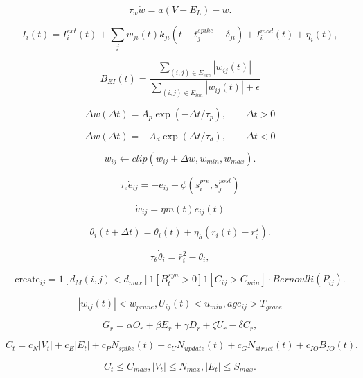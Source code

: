 \[
\tau_{w}\dot{w} = a\left( V - E_{L} \right) - w.
\]

\[
I_{i}(t) = I_{i}^{ext}(t) + \sum_jw_{ji}(t)k_{ji}\left( t - t_{j}^{spike} - \delta_{ji} \right) + I_{i}^{mod}(t) + \eta_{i}(t),
\]

\[
B_{EI}(t) = \frac{\sum_{(i,j)\in E_{exc}}\left| w_{ij}(t) \right|}{\sum_{(i,j)\in E_{inh}}\left| w_{ij}(t) \right| + \epsilon}
\]

\[
\Delta w(\Delta t)=A_p\exp(-\Delta t/\tau_p),\qquad \Delta t>0
\]

\[
\Delta w(\Delta t)=-A_d\exp(\Delta t/\tau_d),\qquad \Delta t<0
\]

\[
w_{ij} \leftarrow clip\left( w_{ij} + \Delta w,w_{min},w_{max} \right).
\]

\[
\tau_{e}{\dot{e}}_{ij} = - e_{ij} + \phi\left( s_{i}^{pre},s_{j}^{post} \right)
\]

\[
{\dot{w}}_{ij} = \eta m(t)e_{ij}(t)
\]

\[
\theta_{i}(t + \Delta t) = \theta_{i}(t) + \eta_{h}\left( \bar{r}_{i}(t) - r_i^{\star} \right).
\]

\[
\tau_{\theta}{\dot{\theta}}_{i} = \bar{r}_{i}^{2} - \theta_{i},
\]

\[
\text{create}_{ij} = 1\left\lbrack d_{M}(i,j) < d_{max} \right\rbrack1\left\lbrack B_{t}^{syn} > 0 \right\rbrack1\left\lbrack C_{ij} > C_{min} \right\rbrack \cdot Bernoulli\left( P_{ij} \right).
\]

\[
\left| w_{ij}(t) \right| < w_{prune},U_{ij}(t) < u_{min},age_{ij} > T_{grace}
\]

\[
G_{r} = \alpha O_{r} + \beta E_{r} + \gamma D_{r} + \zeta U_{r} - \delta C_{r},
\]

\[
C_{t} = c_{N}\left| V_{t} \right| + c_{E}\left| E_{t} \right| + c_{P}N_{spike}(t) + c_{U}N_{update}(t) + c_{G}N_{struct}(t) + c_{IO}B_{IO}(t).
\]

\[
C_{t} \leq C_{max},\left| V_{t} \right| \leq N_{max},\left| E_{t} \right| \leq S_{max}.
\]

